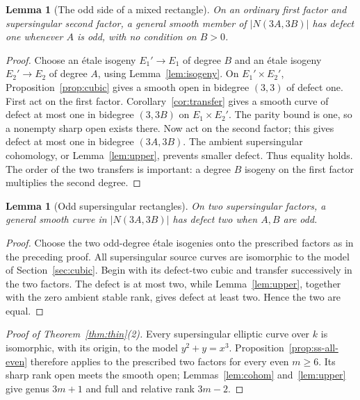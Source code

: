 \documentclass[11pt]{article}
\newtheorem{lemma}[theorem]{Lemma}
\theoremstyle{definition}\newtheorem{definition}[theorem]{Definition}
\theoremstyle{remark}\newtheorem{remark}[theorem]{Remark}
\begin{document}
\begin{lemma}[The odd side of a mixed rectangle]\label{lem:mixed-odd}
On an ordinary first factor and supersingular second factor, a general smooth member of $|N(3A,3B)|$ has defect one whenever $A$ is odd, with no condition on $B>0$.
\end{lemma}
\begin{proof}
Choose an \'etale isogeny $E_1'\to E_1$ of degree $B$ and an \'etale isogeny $E_2'\to E_2$ of degree $A$, using Lemma~\ref{lem:isogeny}. On $E_1'\times E_2'$, Proposition~\ref{prop:cubic} gives a smooth open in bidegree $(3,3)$ of defect one. First act on the first factor. Corollary~\ref{cor:transfer} gives a smooth curve of defect at most one in bidegree $(3,3B)$ on $E_1\times E_2'$. The parity bound is one, so a nonempty sharp open exists there. Now act on the second factor; this gives defect at most one in bidegree $(3A,3B)$. The ambient supersingular cohomology, or Lemma~\ref{lem:upper}, prevents smaller defect. Thus equality holds. The order of the two transfers is important: a degree $B$ isogeny on the first factor multiplies the second degree.
\end{proof}

\begin{lemma}[Odd supersingular rectangles]\label{lem:ss-odd}
On two supersingular factors, a general smooth curve in $|N(3A,3B)|$ has defect two when $A,B$ are odd.
\end{lemma}
\begin{proof}
Choose the two odd-degree \'etale isogenies onto the prescribed factors as in the preceding proof. All supersingular source curves are isomorphic to the model of Section~\ref{sec:cubic}. Begin with its defect-two cubic and transfer successively in the two factors. The defect is at most two, while Lemma~\ref{lem:upper}, together with the zero ambient stable rank, gives defect at least two. Hence the two are equal.
\end{proof}

\begin{proof}[Proof of Theorem~\ref{thm:thin}(2)]
Every supersingular elliptic curve over $k$ is isomorphic, with its origin, to the model $y^2+y=x^3$. Proposition~\ref{prop:ss-all-even} therefore applies to the prescribed two factors for every even $m\ge6$. Its sharp rank open meets the smooth open; Lemmas~\ref{lem:cohom} and~\ref{lem:upper} give genus $3m+1$ and full and relative rank $3m-2$.
\end{proof}
\end{document}
